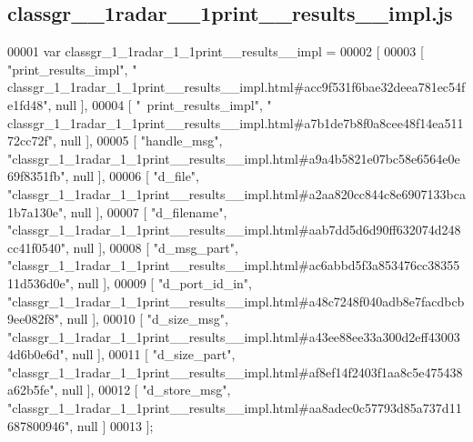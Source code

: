 \subsection{classgr\+\_\+\_\+1radar\+\_\+\_\+1print\+\_\+\+\_\+results\+\_\+\+\_\+impl.\+js}
\label{classgr__1__1radar__1__1print____results____impl_8js_source}

\begin{DoxyCode}
00001 var classgr_1_1radar_1_1print__results__impl =
00002 [
00003     [ \textcolor{stringliteral}{"print\_results\_impl"}, \textcolor{stringliteral}{"
      classgr\_1\_1radar\_1\_1print\_\_results\_\_impl.html#acc9f531f6bae32deea781ec54fe1fd48"}, null ],
00004     [ \textcolor{stringliteral}{"~print\_results\_impl"}, \textcolor{stringliteral}{"
      classgr\_1\_1radar\_1\_1print\_\_results\_\_impl.html#a7b1de7b8f0a8cee48f14ea51172cc72f"}, null ],
00005     [ \textcolor{stringliteral}{"handle\_msg"}, \textcolor{stringliteral}{"classgr\_1\_1radar\_1\_1print\_\_results\_\_impl.html#a9a4b5821e07bc58e6564e0e69f8351fb"}, null
       ],
00006     [ \textcolor{stringliteral}{"d\_file"}, \textcolor{stringliteral}{"classgr\_1\_1radar\_1\_1print\_\_results\_\_impl.html#a2aa820cc844c8e6907133bca1b7a130e"}, null ],
00007     [ \textcolor{stringliteral}{"d\_filename"}, \textcolor{stringliteral}{"classgr\_1\_1radar\_1\_1print\_\_results\_\_impl.html#aab7dd5d6d90ff632074d248cc41f0540"}, null
       ],
00008     [ \textcolor{stringliteral}{"d\_msg\_part"}, \textcolor{stringliteral}{"classgr\_1\_1radar\_1\_1print\_\_results\_\_impl.html#ac6abbd5f3a853476cc3835511d536d0e"}, null
       ],
00009     [ \textcolor{stringliteral}{"d\_port\_id\_in"}, \textcolor{stringliteral}{"classgr\_1\_1radar\_1\_1print\_\_results\_\_impl.html#a48c7248f040adb8e7facdbcb9ee082f8"}, 
      null ],
00010     [ \textcolor{stringliteral}{"d\_size\_msg"}, \textcolor{stringliteral}{"classgr\_1\_1radar\_1\_1print\_\_results\_\_impl.html#a43ee88ee33a300d2eff430034d6b0e6d"}, null
       ],
00011     [ \textcolor{stringliteral}{"d\_size\_part"}, \textcolor{stringliteral}{"classgr\_1\_1radar\_1\_1print\_\_results\_\_impl.html#af8ef14f2403f1aa8c5e475438a62b5fe"}, 
      null ],
00012     [ \textcolor{stringliteral}{"d\_store\_msg"}, \textcolor{stringliteral}{"classgr\_1\_1radar\_1\_1print\_\_results\_\_impl.html#aa8adec0c57793d85a737d11687800946"}, 
      null ]
00013 ];
\end{DoxyCode}
